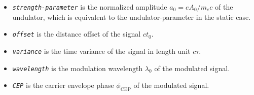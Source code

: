 \begin{enumerate}
\begin{itemize}
	\item {\tt \small \em strength-parameter} is the normalized amplitude $a_0 = e A_0 / m_ec $ of the undulator, which is equivalent to the undulator-parameter in the static case.
	\item {\tt \small \em offset} is the distance offset of the signal $ct_0$.
	\item {\tt \small \em variance} is the time variance of the signal in length unit $c\tau$.
	\item {\tt \small \em wavelength} is the modulation wavelength $\lambda_0$ of the modulated signal.
	\item {\tt \small \em CEP} is the carrier envelope phase $\phi_{\mathrm{CEP}}$ of the modulated signal.
\end{itemize}
%
\end{enumerate}

